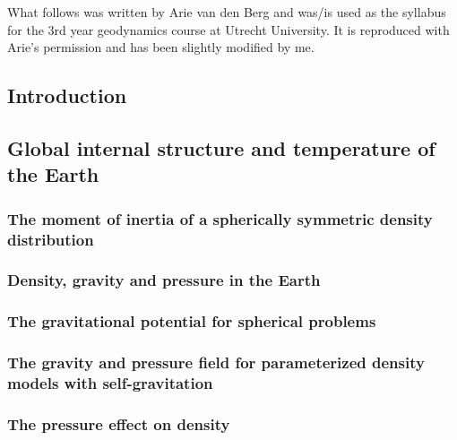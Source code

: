 
What follows was written by Arie van den Berg and was/is used as the syllabus for the 
3rd year geodynamics course at Utrecht University. It is reproduced with Arie's permission
and has been slightly modified by me.

\subsection{Introduction} %
\subsection{Global internal structure and temperature of the Earth} %
\subsubsection{The moment of inertia of a spherically symmetric density distribution} %
\label{sect_scalarmomint}  %
\subsubsection{Density, gravity and pressure in the Earth} %
\label{section_Density-gravity-pressure}  %

\subsubsection{The gravitational potential for spherical problems}
  

\subsubsection{The gravity and pressure field for parameterized density models with self-gravitation}
\label{sect_param_densmod}  %
\subsubsection{The pressure effect on density} %
\label{Pressure_density}  %

